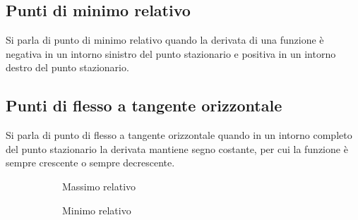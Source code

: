 \subsection{Punti di minimo relativo}
Si parla di punto di minimo relativo quando la derivata di una funzione è negativa in un intorno sinistro del punto stazionario e positiva in un intorno destro del punto stazionario.
\subsection{Punti di flesso a tangente orizzontale}
Si parla di punto di flesso a tangente orizzontale quando in un intorno completo del punto stazionario la derivata mantiene segno costante, per cui la funzione è sempre crescente o sempre decrescente.
\begin{figure}[ht]
    \centering
    \begin{subfigure}{0.24\textwidth}
        \centering
        \caption{Massimo relativo}
    \end{subfigure}
    \begin{subfigure}{0.24\textwidth}
        \centering
        \caption{Minimo relativo}
    \end{subfigure}
    \begin{subfigure}{0.24\textwidth}
        \centering
\end{subfigure}
\end{figure}
